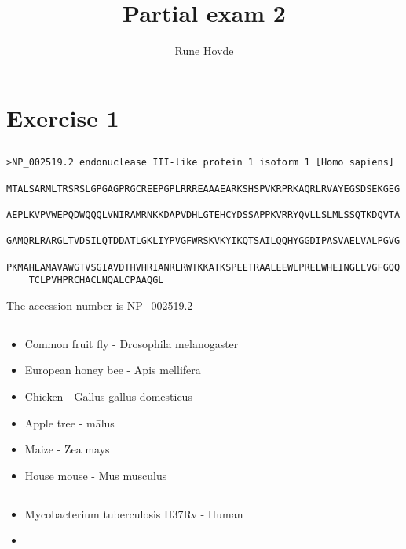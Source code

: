 \documentclass[12pt, table, xcdraw]{article}
\title{Partial exam 2}
\author{Rune Hovde}
\begin{document}
	\duoforside[program={Programming and system architecture},
	dept={Department of Informatics},
	option={IN4030: Introduction to bioinformatics},
	image={DUO_UiO_segl.png},
	printer={X-press printing house},
	short]
	\listoffigures
	\tableofcontents
	\newpage
	
	
	\section{Exercise 1}
	\subsection{}
	\begin{lstlisting}[frame=leftline]
	>NP_002519.2 endonuclease III-like protein 1 isoform 1 [Homo sapiens]
	MTALSARMLTRSRSLGPGAGPRGCREEPGPLRRREAAAEARKSHSPVKRPRKAQRLRVAYEGSDSEKGEG
	AEPLKVPVWEPQDWQQQLVNIRAMRNKKDAPVDHLGTEHCYDSSAPPKVRRYQVLLSLMLSSQTKDQVTA
	GAMQRLRARGLTVDSILQTDDATLGKLIYPVGFWRSKVKYIKQTSAILQQHYGGDIPASVAELVALPGVG
	PKMAHLAMAVAWGTVSGIAVDTHVHRIANRLRWTKKATKSPEETRAALEEWLPRELWHEINGLLVGFGQQ
	TCLPVHPRCHACLNQALCPAAQGL
	\end{lstlisting}
	The accession number is NP\_002519.2
	\subsection{}
	
	\subsection{}	
	\begin{itemize}
		\item Common fruit fly - Drosophila melanogaster
		\item European honey bee - Apis mellifera
		\item Chicken - Gallus gallus domesticus
		\item Apple tree - mālus
		\item Maize - Zea mays
		\item House mouse - Mus musculus
	\end{itemize}

	\subsection{}
	\begin{itemize}
		\item Mycobacterium tuberculosis H37Rv - Human
		\item 
	\end{itemize}
\end{document}
